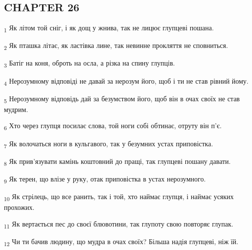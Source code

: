 \subsection{CHAPTER 26}
\begin{tcolorbox}
\textsubscript{1} Як літом той сніг, і як дощ у жнива, так не лицює глупцеві пошана.
\end{tcolorbox}
\begin{tcolorbox}
\textsubscript{2} Як пташка літає, як ластівка лине, так невинне прокляття не сповниться.
\end{tcolorbox}
\begin{tcolorbox}
\textsubscript{3} Батіг на коня, оброть на осла, а різка на спину глупців.
\end{tcolorbox}
\begin{tcolorbox}
\textsubscript{4} Нерозумному відповіді не давай за нерозум його, щоб і ти не став рівний йому.
\end{tcolorbox}
\begin{tcolorbox}
\textsubscript{5} Нерозумному відповідь дай за безумством його, щоб він в очах своїх не став мудрим.
\end{tcolorbox}
\begin{tcolorbox}
\textsubscript{6} Хто через глупця посилає слова, той ноги собі обтинає, отруту він п'є.
\end{tcolorbox}
\begin{tcolorbox}
\textsubscript{7} Як волочаться ноги в кульгавого, так у безумних устах приповістка.
\end{tcolorbox}
\begin{tcolorbox}
\textsubscript{8} Як прив'язувати камінь коштовний до пращі, так глупцеві пошану давати.
\end{tcolorbox}
\begin{tcolorbox}
\textsubscript{9} Як терен, що влізе у руку, отак приповістка в устах нерозумного.
\end{tcolorbox}
\begin{tcolorbox}
\textsubscript{10} Як стрілець, що все ранить, так і той, хто наймає глупця, і наймає усяких прохожих.
\end{tcolorbox}
\begin{tcolorbox}
\textsubscript{11} Як вертається пес до своєї блювотини, так глупоту свою повторяє глупак.
\end{tcolorbox}
\begin{tcolorbox}
\textsubscript{12} Чи ти бачив людину, що мудра в очах своїх? Більша надія глупцеві, ніж їй.
\end{tcolorbox}
